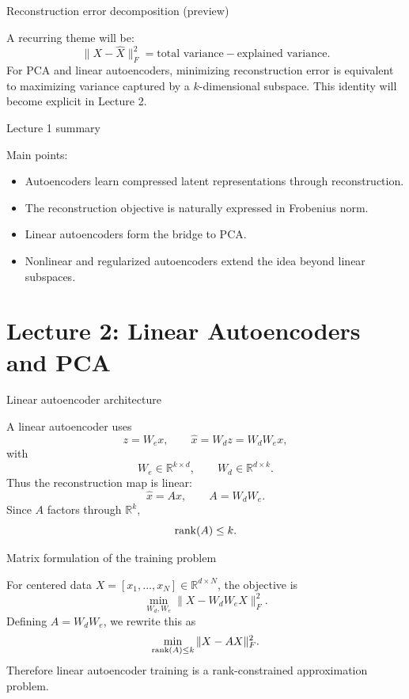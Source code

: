 \documentclass[aspectratio=169]{beamer}
\begin{document}
\begin{frame}{Reconstruction error decomposition (preview)}

A recurring theme will be:
\[
\|X-\hat X\|_F^2 = \text{total variance} - \text{explained variance}.
\]
For PCA and linear autoencoders, minimizing reconstruction error is equivalent to maximizing variance captured by a \(k\)-dimensional subspace.
This identity will become explicit in Lecture 2.

\end{frame}

\begin{frame}{Lecture 1 summary}

Main points:
\begin{itemize}
\item Autoencoders learn compressed latent representations through reconstruction.
\item The reconstruction objective is naturally expressed in Frobenius norm.
\item Linear autoencoders form the bridge to PCA.
\item Nonlinear and regularized autoencoders extend the idea beyond linear subspaces.
\end{itemize}

\end{frame}

\section{Lecture 2: Linear Autoencoders and PCA}

\begin{frame}{Linear autoencoder architecture}

A linear autoencoder uses
\[
z = W_e x,\qquad \hat x = W_d z = W_d W_e x,
\]
with
\[
W_e\in\mathbb{R}^{k\times d},\qquad W_d\in\mathbb{R}^{d\times k}.
\]
Thus the reconstruction map is linear:
\[
\hat x = A x,\qquad A=W_dW_e.
\]
Since \(A\) factors through \(\mathbb{R}^k\),
\[
\rank(A)\le k.
\]

\end{frame}

\begin{frame}{Matrix formulation of the training problem}

For centered data \(X=[x_1,\dots,x_N]\in\mathbb{R}^{d\times N}\), the objective is
\[
\min_{W_d,W_e}\|X-W_dW_eX\|_F^2.
\]
Defining \(A=W_dW_e\), we rewrite this as
\[
\min_{\rank(A)\le k}\|X-AX\|_F^2.
\]
Therefore linear autoencoder training is a rank-constrained approximation problem.

\end{frame}
\end{document}
